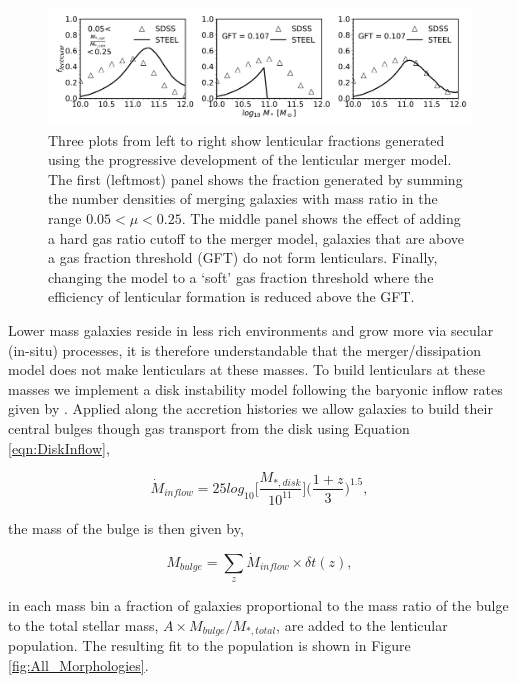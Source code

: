 \begin{figure}
  \includegraphics[width=\linewidth]{Figures/Chapter5/Lenticular_three.pdf}
    \caption{Three plots from left to right show lenticular fractions generated using the progressive development of the lenticular merger model. The first (leftmost) panel shows the fraction generated by summing the number densities of merging galaxies with mass ratio in the range $0.05 < \mu < 0.25$. The middle panel shows the effect of adding a hard gas ratio cutoff to the merger model, galaxies that are above a gas fraction threshold (GFT) do not form lenticulars. Finally, changing the model to a `soft' gas fraction threshold where the efficiency of lenticular formation is reduced above the GFT.}
    \label{fig:Lentcular_panels}
\end{figure}

Lower mass galaxies reside in less rich environments and grow more via secular (in-situ) processes, it is therefore understandable that the merger/dissipation model does not make lenticulars at these masses. To build lenticulars at these masses we implement a disk instability model following the baryonic inflow rates given by \citet{Bournaud2011BLACKSTREAMS}. Applied along the accretion histories we allow galaxies to build their central bulges though gas transport from the disk using Equation \ref{eqn:DiskInflow}, 

\begin{equation}
    \label{eqn:DiskInflow}
    \dot{M}_{inflow} = 25 log_{10}\Big[\frac{M_{*,disk}}{10^{11}}\Big]\Big(\frac{1 + z}{3}\Big)^{1.5},
\end{equation}

the mass of the bulge is then given by,

\begin{equation}
    M_{bulge} = \sum_z \dot{M}_{inflow} \times \delta t(z),
\end{equation}

in each mass bin a fraction of galaxies proportional to the mass ratio of the bulge to the total stellar mass, $A \times M_{bulge} / M_{*, total}$, are added to the lenticular population. The resulting fit to the population is shown in Figure \ref{fig:All_Morphologies}.

